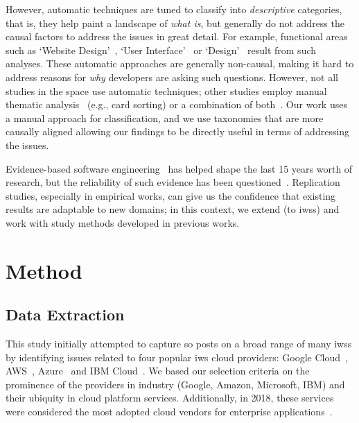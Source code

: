 However, automatic techniques are tuned to classify into \textit{descriptive} categories, that is, they help paint a landscape of \textit{what is}, but generally do not address the causal factors to address the issues in great detail. For example, functional areas such as `Website Design'~\citep{Barua:2012gz}, `User Interface'~\citep{Beyer:2014ec} or `Design'~\citep{Uddin:2015hn} result from such analyses. These automatic approaches are generally non-causal, making it hard to address reasons for \textit{why} developers are asking such questions. However, not all studies in the space use automatic techniques; other studies employ manual thematic analysis~\citep{Tahir:2018ks,Aghajani:2019bo,Barzilay:2013cn} (e.g., card sorting) or a combination of both~\citep{Beyer:2018fm,Beyer:2014ec,Rosen:2016uk,Treude:2011fh}. Our work uses a manual approach for classification, and we use taxonomies that are more causally aligned allowing our findings to be directly useful in terms of addressing the issues.

Evidence-based software engineering~\citep{Kitchenham:2004vj} has helped shape the last 15 years worth of research, but the reliability of such evidence has been questioned~\citep{rgensen:2016gl,Juristo:2012bp,Shepperd:2018hr}.
Replication studies, especially in empirical works, can give us the confidence that existing results are adaptable to new domains; in this context, we extend (to \glspl{iws}) and work with study methods developed in previous works.

\section{Method}
\label{icse2020:sec:method}

\subsection{Data Extraction}

This study initially attempted to capture \gls{so} posts on a broad range of many \glspl{iws} by identifying issues related to four popular \gls{iws} cloud providers: Google Cloud~, AWS~, Azure~ and IBM Cloud~.
We based our selection criteria on the prominence of the providers in industry (Google, Amazon, Microsoft, IBM) and their ubiquity in cloud platform services. Additionally, in 2018, these services were considered the most adopted cloud vendors for enterprise applications~\citep{RightScaleInc:2018kJ}.

